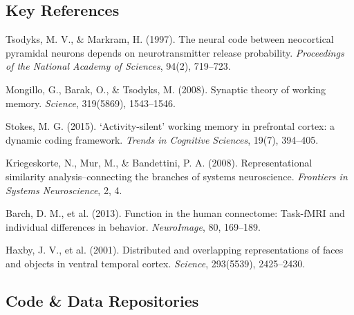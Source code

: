 \documentclass[11pt,a4paper]{article}
\begin{document}
\subsection{Key References}

\begin{enumerate}[label={[\arabic*]}]
    \item Tsodyks, M. V., \& Markram, H. (1997). The neural code between neocortical pyramidal neurons depends on neurotransmitter release probability. \textit{Proceedings of the National Academy of Sciences}, 94(2), 719--723.
    \item Mongillo, G., Barak, O., \& Tsodyks, M. (2008). Synaptic theory of working memory. \textit{Science}, 319(5869), 1543--1546.
    \item Stokes, M. G. (2015). ‘Activity-silent’ working memory in prefrontal cortex: a dynamic coding framework. \textit{Trends in Cognitive Sciences}, 19(7), 394--405.
    \item Kriegeskorte, N., Mur, M., \& Bandettini, P. A. (2008). Representational similarity analysis–connecting the branches of systems neuroscience. \textit{Frontiers in Systems Neuroscience}, 2, 4.
    \item Barch, D. M., et al. (2013). Function in the human connectome: Task-fMRI and individual differences in behavior. \textit{NeuroImage}, 80, 169--189.
    \item Haxby, J. V., et al. (2001). Distributed and overlapping representations of faces and objects in ventral temporal cortex. \textit{Science}, 293(5539), 2425--2430.
\end{enumerate}

\subsection{Code \& Data Repositories}
\end{document}
